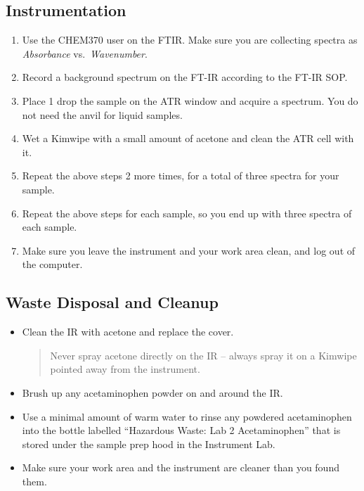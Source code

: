 \documentclass[]{tufte-book}
\providecommand{\tightlist}{%
  \setlength{\itemsep}{0pt}\setlength{\parskip}{0pt}}
\begin{document}
\hypertarget{instrumentation-1}{%
\subsection{Instrumentation}\label{instrumentation-1}}

\begin{enumerate}
\def\labelenumi{\arabic{enumi}.}
\tightlist
\item
  Use the CHEM370 user on the FTIR. Make sure you are collecting spectra as \emph{Absorbance} vs.~\emph{Wavenumber}.
\item
  Record a background spectrum on the FT-IR according to the FT-IR SOP.
\item
  Place 1 drop the sample on the ATR window and acquire a spectrum. You do not need the anvil for liquid samples.
\item
  Wet a Kimwipe with a small amount of acetone and clean the ATR cell with it.
\item
  Repeat the above steps 2 more times, for a total of three spectra for your sample.
\item
  Repeat the above steps for each sample, so you end up with three spectra of each sample.
\item
  Make sure you leave the instrument and your work area clean, and log out of the computer.
\end{enumerate}

\hypertarget{waste-disposal-and-cleanup-2}{%
\subsection{Waste Disposal and Cleanup}\label{waste-disposal-and-cleanup-2}}

\begin{itemize}
\item
  Clean the IR with acetone and replace the cover.

  \begin{quote}
  Never spray acetone directly on the IR -- always spray it on a Kimwipe pointed away from the instrument.
  \end{quote}
\item
  Brush up any acetaminophen powder on and around the IR.
\item
  Use a minimal amount of warm water to rinse any powdered acetaminophen into the bottle labelled ``Hazardous Waste: Lab 2 Acetaminophen'' that is stored under the sample prep hood in the Instrument Lab.
\item
  Make sure your work area and the instrument are cleaner than you found them.
\end{itemize}
\end{document}
